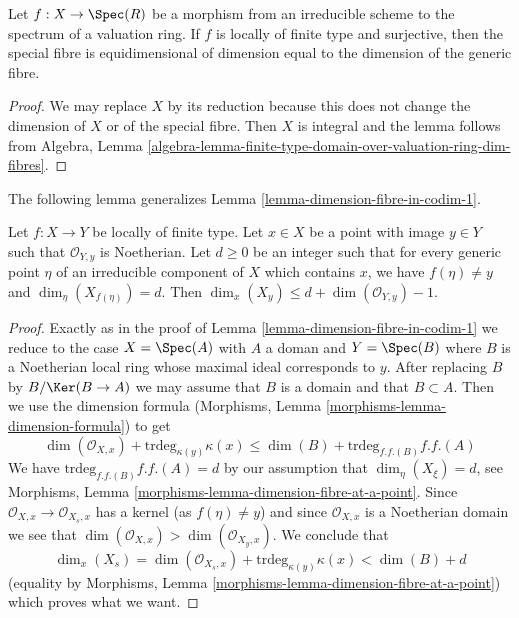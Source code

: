 \begin{lemma}
\label{lemma-dominate-valuation-ring-dimension-fibres}
Let $f : X \to \Spec(R)$ be a morphism from an irreducible
scheme to the spectrum of a valuation ring. If $f$ is locally
of finite type and surjective, then the special fibre is
equidimensional of dimension equal to the dimension of the generic fibre.
\end{lemma}

\begin{proof}
We may replace $X$ by its reduction because this does not change the
dimension of $X$ or of the special fibre. Then $X$ is integral and
the lemma follows from Algebra, Lemma
\ref{algebra-lemma-finite-type-domain-over-valuation-ring-dim-fibres}.
\end{proof}

\noindent
The following lemma generalizes Lemma \ref{lemma-dimension-fibre-in-codim-1}.

\begin{lemma}
\label{lemma-dimension-fibre-in-higher-codimension}
Let $f : X \to Y$ be locally of finite type. Let $x \in X$ be a point
with image $y \in Y$ such that $\mathcal{O}_{Y, y}$ is Noetherian. Let
$d \geq 0$ be an integer such that for every generic point $\eta$ of an
irreducible component of $X$ which contains $x$, we have
$f(\eta) \not = y$ and $\dim_\eta(X_{f(\eta)}) = d$. Then
$\dim_x(X_y) \leq d + \dim(\mathcal{O}_{Y, y}) - 1$.
\end{lemma}

\begin{proof}
Exactly as in the proof of Lemma \ref{lemma-dimension-fibre-in-codim-1}
we reduce to the case $X = \Spec(A)$ with $A$ a doman and $Y = \Spec(B)$
where $B$ is a Noetherian local ring whose maximal ideal corresponds to $y$.
After replacing $B$ by $B/\Ker(B \to A)$ we may assume that $B$
is a domain and that $B \subset A$.
Then we use the dimension formula
(Morphisms, Lemma \ref{morphisms-lemma-dimension-formula}) to get
$$
\dim(\mathcal{O}_{X, x}) + \text{trdeg}_{\kappa(y)} \kappa(x) \leq
\dim(B) + \text{trdeg}_{f.f.(B)} f.f.(A)
$$
We have $\text{trdeg}_{f.f.(B)} f.f.(A) = d$ by
our assumption that $\dim_\eta(X_\xi) = d$, see
Morphisms, Lemma \ref{morphisms-lemma-dimension-fibre-at-a-point}.
Since $\mathcal{O}_{X, x} \to \mathcal{O}_{X_s, x}$ has a kernel
(as $f(\eta) \not = y$) and since $\mathcal{O}_{X, x}$
is a Noetherian domain we see that
$\dim(\mathcal{O}_{X, x}) > \dim(\mathcal{O}_{X_y, x})$.
We conclude that
$$
\dim_x(X_s) =
\dim(\mathcal{O}_{X_s, x}) + \text{trdeg}_{\kappa(y)} \kappa(x)
< \dim(B) + d
$$
(equality by Morphisms, Lemma \ref{morphisms-lemma-dimension-fibre-at-a-point})
which proves what we want.
\end{proof}




